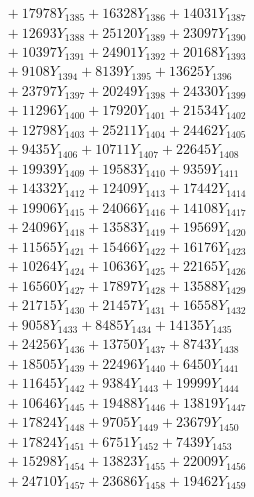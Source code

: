 \documentclass[a4paper,10pt]{article}
\begin{document}
{\begin{align}
&\;  + 17978 Y_{1385} + 16328 Y_{1386} + 14031 Y_{1387} \\[0.3ex]
&\;  + 12693 Y_{1388} + 25120 Y_{1389} + 23097 Y_{1390} \\[0.3ex]
&\;  + 10397 Y_{1391} + 24901 Y_{1392} + 20168 Y_{1393} \\[0.3ex]
&\;  + 9108 Y_{1394} + 8139 Y_{1395} + 13625 Y_{1396} \\[0.3ex]
&\;  + 23797 Y_{1397} + 20249 Y_{1398} + 24330 Y_{1399} \\[0.3ex]
&\;  + 11296 Y_{1400} + 17920 Y_{1401} + 21534 Y_{1402} \\[0.3ex]
&\;  + 12798 Y_{1403} + 25211 Y_{1404} + 24462 Y_{1405} \\[0.3ex]
&\;  + 9435 Y_{1406} + 10711 Y_{1407} + 22645 Y_{1408} \\[0.5ex]\allowbreak
&\;  + 19939 Y_{1409} + 19583 Y_{1410} + 9359 Y_{1411} \\[0.3ex]
&\;  + 14332 Y_{1412} + 12409 Y_{1413} + 17442 Y_{1414} \\[0.3ex]
&\;  + 19906 Y_{1415} + 24066 Y_{1416} + 14108 Y_{1417} \\[0.3ex]
&\;  + 24096 Y_{1418} + 13583 Y_{1419} + 19569 Y_{1420} \\[0.3ex]
&\;  + 11565 Y_{1421} + 15466 Y_{1422} + 16176 Y_{1423} \\[0.3ex]
&\;  + 10264 Y_{1424} + 10636 Y_{1425} + 22165 Y_{1426} \\[0.3ex]
&\;  + 16560 Y_{1427} + 17897 Y_{1428} + 13588 Y_{1429} \\[0.3ex]
&\;  + 21715 Y_{1430} + 21457 Y_{1431} + 16558 Y_{1432} \\[0.3ex]
&\;  + 9058 Y_{1433} + 8485 Y_{1434} + 14135 Y_{1435} \\[0.3ex]
&\;  + 24256 Y_{1436} + 13750 Y_{1437} + 8743 Y_{1438} \\[0.5ex]\allowbreak
&\;  + 18505 Y_{1439} + 22496 Y_{1440} + 6450 Y_{1441} \\[0.3ex]
&\;  + 11645 Y_{1442} + 9384 Y_{1443} + 19999 Y_{1444} \\[0.3ex]
&\;  + 10646 Y_{1445} + 19488 Y_{1446} + 13819 Y_{1447} \\[0.3ex]
&\;  + 17824 Y_{1448} + 9705 Y_{1449} + 23679 Y_{1450} \\[0.3ex]
&\;  + 17824 Y_{1451} + 6751 Y_{1452} + 7439 Y_{1453} \\[0.3ex]
&\;  + 15298 Y_{1454} + 13823 Y_{1455} + 22009 Y_{1456} \\[0.3ex]
&\;  + 24710 Y_{1457} + 23686 Y_{1458} + 19462 Y_{1459} \\[0.3ex]

\end{align}}
\end{document}
